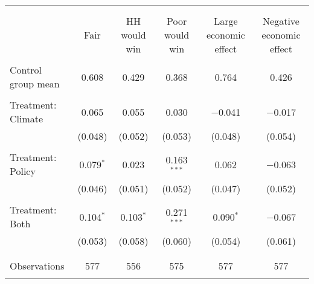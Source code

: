
\begin{tabular}{@{\extracolsep{5pt}}lccccc} 
\\[-1.8ex]\hline 
\hline \\[-1.8ex] 
\\[-1.8ex] & Fair & HH would win & Poor would win & Large economic effect & Negative economic effect \\ 
\hline \\[-1.8ex] 
 Control group mean & 0.608 & 0.429 & 0.368 & 0.764 & 0.426  \\ \hline \\[-1.8ex] Treatment: Climate & 0.065 & 0.055 & 0.030 & $-$0.041 & $-$0.017 \\ 
  & (0.048) & (0.052) & (0.053) & (0.048) & (0.054) \\ 
  & & & & & \\ 
 Treatment: Policy & 0.079$^{*}$ & 0.023 & 0.163$^{***}$ & 0.062 & $-$0.063 \\ 
  & (0.046) & (0.051) & (0.052) & (0.047) & (0.052) \\ 
  & & & & & \\ 
 Treatment: Both & 0.104$^{*}$ & 0.103$^{*}$ & 0.271$^{***}$ & 0.090$^{*}$ & $-$0.067 \\ 
  & (0.053) & (0.058) & (0.060) & (0.054) & (0.061) \\ 
  & & & & & \\ 
\hline \\[-1.8ex] 

Observations & 577 & 556 & 575 & 577 & 577 \\ 
\hline 
\hline \\[-1.8ex] 
\end{tabular} 